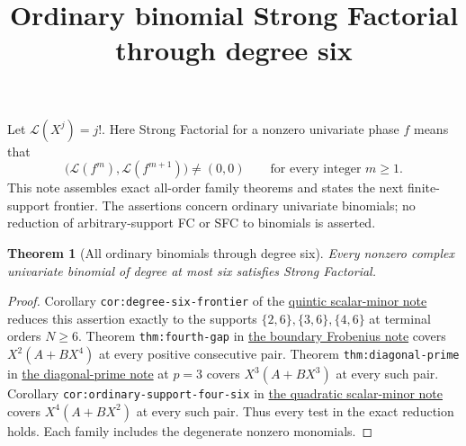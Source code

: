\documentclass[11pt]{article}
\newtheorem{theorem}{Theorem}
\begin{document}
\setlength{\emergencystretch}{2em}
\title{Ordinary binomial Strong Factorial through degree six}
\author{}\date{}\maketitle
Let $\mathcal L(X^j)=j!$. Here Strong Factorial for a nonzero
univariate phase $f$ means that
\[
 \bigl(\mathcal L(f^m),\mathcal L(f^{m+1})\bigr)\ne(0,0)
 \qquad\text{for every integer }m\ge1.
\]
This note assembles exact all-order family theorems and states the
next finite-support frontier. The assertions concern ordinary
univariate binomials; no reduction of arbitrary-support FC or SFC
to binomials is asserted.

\begin{theorem}[All ordinary binomials through degree six]
\label{thm:degree-six}
Every nonzero complex univariate binomial of degree at most six
satisfies Strong Factorial.
\end{theorem}
\begin{proof}
Corollary \texttt{cor:degree-six-frontier} of the
\href{QUINTIC_SCALAR_MINOR_SFC.tex}{quintic scalar-minor note}
reduces this assertion exactly to the supports
$\{2,6\},\{3,6\},\{4,6\}$ at terminal orders $N\ge6$.
Theorem \texttt{thm:fourth-gap} in
\href{LOWER_TWO_FOURTH_POWER_GAP_SFC.tex}{the boundary Frobenius note}
covers $X^2(A+BX^4)$ at every positive consecutive pair.
Theorem \texttt{thm:diagonal-prime} in
\href{DIAGONAL_PRIME_GAP_SFC.tex}{the diagonal-prime note}
at $p=3$ covers $X^3(A+BX^3)$ at every such pair.
Corollary \texttt{cor:ordinary-support-four-six} in
\href{LOWER_FOUR_QUADRATIC_GAP_SFC.tex}{the quadratic scalar-minor note}
covers $X^4(A+BX^2)$ at every such pair.
Thus every test in the exact reduction holds.
Each family includes the degenerate nonzero monomials.
\end{proof}
\end{document}
